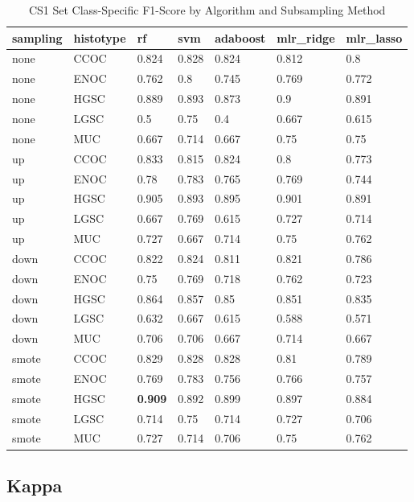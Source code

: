\documentclass[
]{report}
\begin{document}
\begin{table}

\caption{\label{tab:cs1-f1-class-table}CS1 Set Class-Specific F1-Score by Algorithm and Subsampling Method}
\centering
\begin{tabular}[t]{l|l|l|l|l|l|l}
\hline
sampling & histotype & rf & svm & adaboost & mlr\_ridge & mlr\_lasso\\
\hline
none & CCOC & 0.824 & 0.828 & 0.824 & 0.812 & 0.8\\
\hline
none & ENOC & 0.762 & 0.8 & 0.745 & 0.769 & 0.772\\
\hline
none & HGSC & 0.889 & 0.893 & 0.873 & 0.9 & 0.891\\
\hline
none & LGSC & 0.5 & 0.75 & 0.4 & 0.667 & 0.615\\
\hline
none & MUC & 0.667 & 0.714 & 0.667 & 0.75 & 0.75\\
\hline
up & CCOC & 0.833 & 0.815 & 0.824 & 0.8 & 0.773\\
\hline
up & ENOC & 0.78 & 0.783 & 0.765 & 0.769 & 0.744\\
\hline
up & HGSC & 0.905 & 0.893 & 0.895 & 0.901 & 0.891\\
\hline
up & LGSC & 0.667 & 0.769 & 0.615 & 0.727 & 0.714\\
\hline
up & MUC & 0.727 & 0.667 & 0.714 & 0.75 & 0.762\\
\hline
down & CCOC & 0.822 & 0.824 & 0.811 & 0.821 & 0.786\\
\hline
down & ENOC & 0.75 & 0.769 & 0.718 & 0.762 & 0.723\\
\hline
down & HGSC & 0.864 & 0.857 & 0.85 & 0.851 & 0.835\\
\hline
down & LGSC & 0.632 & 0.667 & 0.615 & 0.588 & 0.571\\
\hline
down & MUC & 0.706 & 0.706 & 0.667 & 0.714 & 0.667\\
\hline
smote & CCOC & 0.829 & 0.828 & 0.828 & 0.81 & 0.789\\
\hline
smote & ENOC & 0.769 & 0.783 & 0.756 & 0.766 & 0.757\\
\hline
smote & HGSC & \textbf{0.909} & 0.892 & 0.899 & 0.897 & 0.884\\
\hline
smote & LGSC & 0.714 & 0.75 & 0.714 & 0.727 & 0.706\\
\hline
smote & MUC & 0.727 & 0.714 & 0.706 & 0.75 & 0.762\\
\hline
\end{tabular}
\end{table}

\hypertarget{kappa-1}{%
\subsection{Kappa}\label{kappa-1}}
\end{document}
